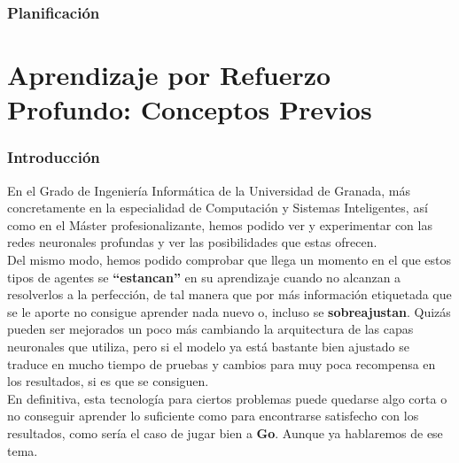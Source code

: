 \documentclass[11pt,fleqn]{book} %
\begin{document}
\section{Planificación}\label{sec:planificacion}



\part{Aprendizaje por Refuerzo Profundo: Conceptos Previos}

\section*{Introducción}

En el Grado de Ingeniería Informática de la Universidad de Granada, más concretamente en la especialidad de Computación y Sistemas Inteligentes, así como en el Máster profesionalizante, hemos podido ver y experimentar con las redes neuronales profundas y ver las posibilidades que estas ofrecen. \\

Del mismo modo, hemos podido comprobar que llega un momento en el que estos tipos de agentes se \textbf{``estancan''} en su aprendizaje cuando no alcanzan a resolverlos a la perfección, de tal manera que por más información etiquetada que se le aporte no consigue aprender nada nuevo o, incluso se \textbf{sobreajustan}. Quizás pueden ser mejorados un poco más cambiando la arquitectura de las capas neuronales que utiliza, pero si el modelo ya está bastante bien ajustado se traduce en mucho tiempo de pruebas y cambios para muy poca recompensa en los resultados, si es que se consiguen. \\

En definitiva, esta tecnología para ciertos problemas puede quedarse algo corta o no conseguir aprender lo suficiente como para encontrarse satisfecho con los resultados, como sería el caso de jugar bien a \textbf{Go}. Aunque ya hablaremos de ese tema.\cite{article:go} \\
\end{document}
